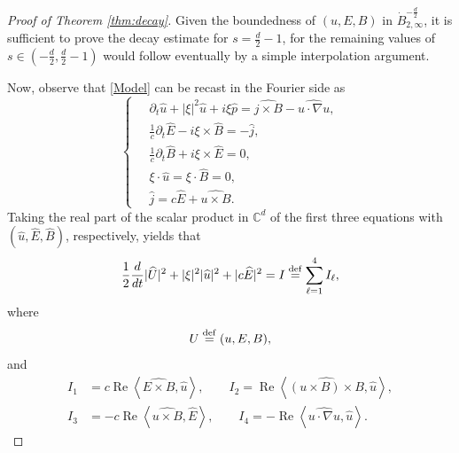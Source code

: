 \documentclass[11pt, leqno, a4paper,]{amsart}
\theoremstyle{remark}
\numberwithin{equation}{section}
\newcommand*{\bydef}{\overset{\rm def}{=}}
\begin{document}
   \begin{proof}[Proof of Theorem \ref{thm:decay}]
   Given the boundedness of $(u,E,B)$ in $\dot B^{-\frac{d}{2}}_{2,\infty}$, it is sufficient to prove the decay estimate for $s=\frac{d}{2}-1$, for the remaining values of $s\in (-\frac{d}{2},\frac{d}{2}-1)$
    would follow eventually by a simple interpolation argument.
    
  Now, observe that \eqref{Model} can be recast in the Fourier side as
   \begin{equation}\label{Main_Fourier}
\left\{\
\begin{aligned}
&\partial_t \widehat u+ |\xi|^2\widehat u+i\xi \widehat p
   =\widehat{j\times B}-\widehat{u\cdot\nabla u},\\
&\frac{1}{c} \partial_t \widehat E-i\xi\times \widehat B=-\widehat j,\\
&\frac{1}{c}\partial_t \widehat B+i\xi\times \widehat E=0,\\
&\xi\cdot \widehat u=\xi\cdot \widehat B=0,\\
&\widehat j=c\widehat E+\widehat{u\times B}.
\end{aligned}
\right.
\end{equation}
Taking the real part of the scalar product in $\mathbb{C}^d $ of the first three equations with   $ (\widehat u, \widehat E, \widehat B)$, respectively, yields that\begin{equation}\label{Fourier_Energy}
\begin{aligned}
\frac12\frac{d}{dt} |\widehat U|^2
+  |\xi|^2|\widehat u|^2
+|c\widehat E|^2
=I \bydef \sum_{\ell =1}^4 I_\ell  ,
\end{aligned}
\end{equation}
where
\begin{equation*}
  	U\bydef (u,E,B), 
  \end{equation*}  
and
\begin{equation*}
	\begin{aligned}
		I_1&=c
\operatorname{Re}
\left \langle
\widehat{E\times B},  \widehat u
\right \rangle,
\qquad I_2=
\operatorname{Re}
\left \langle
\widehat{(u\times B)\times B},
 \widehat u
\right \rangle,
\\
I_3&=-c
\operatorname{Re}
\left \langle
\widehat{u\times B},
 \widehat E
\right \rangle
, 
\qquad I_4=-
\operatorname{Re}
\left \langle
\widehat{u\cdot\nabla u},
\widehat u
\right \rangle.
	\end{aligned}
\end{equation*} 


\end{proof}
\end{document}
